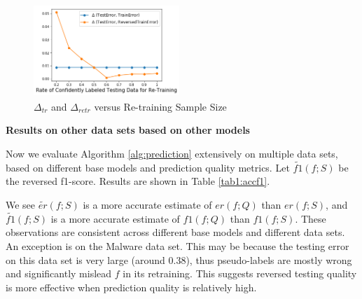 \begin{figure}[h]
\centering
\includegraphics[width=5.5cm,height=3.5cm]{exp1_confidence.png}
\vspace{-10pt}
\caption{$\Delta_{tr}$ and $\Delta_{retr}$ versus Re-training Sample Size}
\label{exp1:confidence}
\end{figure}

{\noindent \bf Results on other data sets based on 
other models} 

Now we evaluate Algorithm \ref{alg:prediction} 
extensively on multiple data sets, based on different 
base models and prediction quality metrics. 
Let $\tilde{f1}(f; S)$ be the reversed f1-score. 
Results are shown in Table \ref{tab1:accf1}. 

We see $\tilde{er}(f; S)$ is a more 
accurate estimate of $er(f; Q)$ than $er(f; S)$, 
and $\tilde{f1}(f; S)$ is a more accurate 
estimate of $f1(f; Q)$ than $f1(f; S)$. 
These observations are consistent across different 
base models and different data sets. 
An exception is on the Malware data set. 
This may be because the testing error on this data set 
is very large (around 0.38), thus pseudo-labels are 
mostly wrong and significantly mislead $f$ in its retraining. 
This suggests reversed testing quality is more effective 
when prediction quality is relatively high. 






























